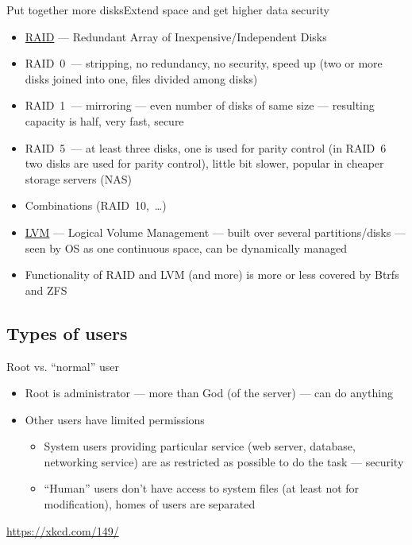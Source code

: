 \documentclass[compress, ucs, xelatex, 11pt, xcolor=svgnames, aspectratio=169,
	hyperref={
		bookmarks=true,
		unicode=true,
		colorlinks=true,
		pdftitle={Linux, command line and MetaCentrum},
		plainpages=false,
		pdfauthor={Vojtech Zeisek},
		pdfsubject={Course about use of Linux command line, writing shell scripts and using MetaCentrum of CESNET},
		pdfcreator={XeLaTeX},
		pdfkeywords={Linux, GNU, BASH, shell, command line, MetaCentrum},
		linkcolor=DarkRed, %
		anchorcolor=DarkBlue, %
		citecolor=Indigo, %
		filecolor=NavyBlue, %
		menucolor=DarkMagenta, %
		urlcolor=DarkBlue, %
		pdftex},
	url={hyphens, lowtilde} %
	]{beamer}
\renewcommand{\texttt}[1]{\colorbox{Beige}{{\ttfamily #1}}}
\begin{document}
\begin{frame}{Put together more disks}{Extend space and get higher data security}
	\label{LVMRAID}
	\begin{itemize}
		\item \href{https://en.wikipedia.org/wiki/RAID}{RAID} --- Redundant Array of Inexpensive/Independent Disks
		\item RAID~0~--- stripping, no redundancy, no security, speed up (two or more disks joined into one, files divided among disks)
		\item RAID~1~--- mirroring --- even number of disks of same size --- resulting capacity is half, very fast, secure
		\item RAID~5~--- at least three disks, one is used for parity control (in RAID~6 two disks are used for parity control), little bit slower, popular in cheaper storage servers (NAS)
		\item Combinations (RAID~10,~\ldots)
		\item \href{https://en.wikipedia.org/wiki/Logical_volume_management}{LVM} --- Logical Volume Management --- built over several partitions/disks --- seen by OS as one continuous space, can be dynamically managed
		\item Functionality of RAID and LVM (and more) is more or less covered by Btrfs and ZFS
	\end{itemize}
\end{frame}

\subsection{Types of users}

\begin{frame}{Root vs. \enquote{normal} user}
	\label{root}
	\begin{itemize}
		\item Root is administrator --- more than God (of the server) --- can do anything
		\item Other users have limited permissions
		\begin{itemize}
			\item System users providing particular service (web server, database, networking service) are as restricted as possible to do the task --- security
			\item \enquote{Human} users don't have access to system files (at least not for modification), homes of users are separated
		\end{itemize}
	\end{itemize}
	\begin{center}
		\texttt{[image: sandwich.png]}
	\end{center}
	\begin{flushright}
		\url{https://xkcd.com/149/}
	\end{flushright}
\end{frame}
\end{document}
